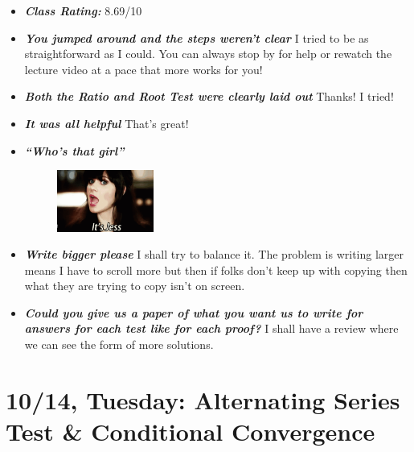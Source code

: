 \documentclass[11pt,letterpaper]{article}
\begin{document}
\begin{itemize}
\item {\bfseries\itshape Class Rating:} 8.69/10

\item {\bfseries\itshape You jumped around and the steps weren't clear} I tried to be as straightforward as I could. You can always stop by for help or rewatch the lecture video at a pace that more works for you!

\item {\bfseries\itshape Both the Ratio and Root Test were clearly laid out} Thanks! I tried!

\item {\bfseries\itshape It was all helpful} That's great!

\item {\bfseries\itshape ``Who's that girl''}
	\begin{figure}[H]
	\centering
	\includegraphics[width=0.30\textwidth]{images/jess.png}
	\end{figure}

\item {\bfseries\itshape Write bigger please} I shall try to balance it. The problem is writing larger means I have to scroll more but then if folks don't keep up with copying then what they are trying to copy isn't on screen.

\item {\bfseries\itshape Could you give us a paper of what you want us to write for answers for each test like for each proof?} I shall have a review where we can see the form of more solutions.
\end{itemize}

\newpage
\section*{10/14, Tuesday: Alternating Series Test \& Conditional Convergence\label{10-14}}
\end{document}
